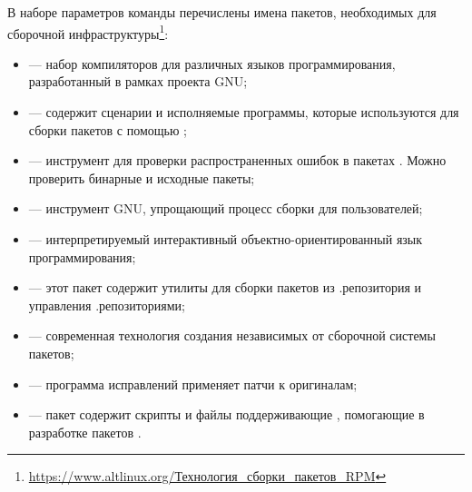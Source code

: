

В наборе параметров команды  перечислены имена пакетов, необходимых для сборочной 
инфраструктуры\footnote{\href{https://www.altlinux.org/Технология_сборки_пакетов_RPM}{https://www.altlinux.org/Технология\_сборки\_пакетов\_RPM}}:

\begin{itemize}
	\item {} --- набор компиляторов для различных языков программирования, разработанный в рамках проекта GNU;
	\item {} --- содержит сценарии и исполняемые программы, которые используются для сборки пакетов с помощью ;
	\item {} --- инструмент для проверки распространенных ошибок в пакетах . Можно проверить бинарные и исходные пакеты;
	\item {} --- инструмент GNU, упрощающий процесс сборки для пользователей;
	\item {} --- интерпретируемый интерактивный объектно-ориентированный язык программирования;
	\item {} --- этот пакет содержит утилиты для сборки пакетов  из .репозитория и управления .репозиториями;
	\item {} --- современная технология создания независимых от сборочной системы пакетов;
	\item {} --- программа исправлений применяет патчи к оригиналам;
	\item {} --- пакет содержит скрипты и файлы поддерживающие , помогающие в разработке пакетов .
\end{itemize}



